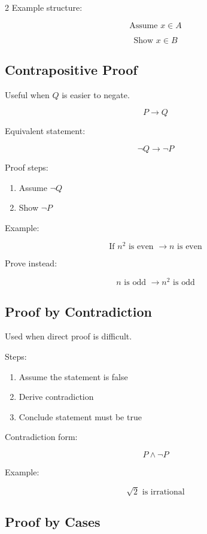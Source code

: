 \documentclass[10pt]{article}
\begin{document}
\begin{multicols}{2}
Example structure:

\[
\text{Assume } x \in A
\]

\[
\text{Show } x \in B
\]

\subsection*{Contrapositive Proof}

Useful when $Q$ is easier to negate.

\[
P \rightarrow Q
\]

Equivalent statement:

\[
\neg Q \rightarrow \neg P
\]

Proof steps:

\begin{enumerate}
\item Assume $\neg Q$
\item Show $\neg P$
\end{enumerate}

Example:

\[
\text{If } n^2 \text{ is even } \rightarrow n \text{ is even}
\]

Prove instead:

\[
n \text{ is odd } \rightarrow n^2 \text{ is odd}
\]

\subsection*{Proof by Contradiction}

Used when direct proof is difficult.

Steps:

\begin{enumerate}
\item Assume the statement is false
\item Derive contradiction
\item Conclude statement must be true
\end{enumerate}

Contradiction form:

\[
P \land \neg P
\]

Example:

\[
\sqrt{2} \text{ is irrational}
\]

\subsection*{Proof by Cases}


\end{multicols}
\end{document}
